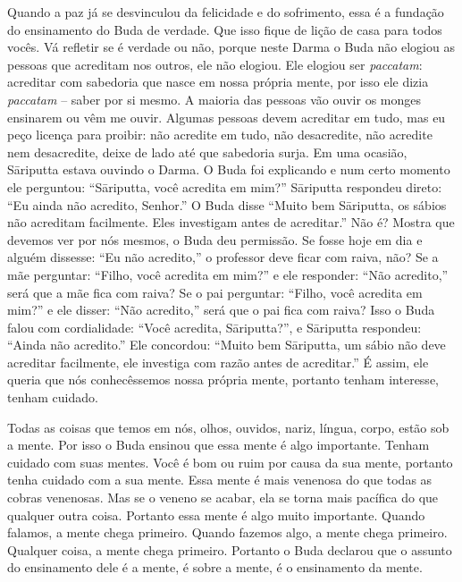 Quando a paz já se desvinculou da felicidade e do sofrimento, essa é
a fundação do ensinamento do Buda de verdade. Que isso fique de lição
de casa para todos vocês. Vá refletir se é verdade ou não, porque neste
Darma o Buda não elogiou as pessoas que acreditam nos outros, ele não
elogiou. Ele elogiou ser \textit{paccatam}: acreditar com sabedoria que
nasce em nossa própria mente, por isso ele dizia \textit{paccatam}
– saber por si mesmo. A maioria das pessoas vão
ouvir os monges ensinarem ou vêm me ouvir. Algumas pessoas devem
acreditar em tudo, mas eu peço licença para proibir: não acredite em
tudo, não desacredite, não acredite nem desacredite, deixe de lado até
que sabedoria surja. Em uma ocasião, Sāriputta estava ouvindo o
Darma. O Buda foi explicando e num certo momento ele perguntou:
“Sāriputta, você acredita em mim?” Sāriputta respondeu direto: “Eu
ainda não acredito, Senhor.” O Buda disse “Muito bem Sāriputta, os
sábios não acreditam facilmente. Eles investigam antes de acreditar.”
Não é? Mostra que devemos ver por nós mesmos, o Buda deu permissão. Se
fosse hoje em dia e alguém dissesse: “Eu não acredito,” o
professor deve ficar com raiva, não? Se a mãe perguntar:
“Filho, você acredita em mim?” e ele responder: “Não acredito,” será
que a mãe fica com raiva? Se o pai perguntar: “Filho, você acredita em
mim?” e ele disser: “Não acredito,” será que o pai fica com raiva? Isso
o Buda falou com cordialidade: “Você acredita, Sāriputta?”, e
Sāriputta respondeu: “Ainda não acredito.” Ele concordou: “Muito bem
Sāriputta, um sábio não deve acreditar facilmente, ele investiga com
razão antes de acreditar.” É assim, ele queria que nós conhecêssemos
nossa própria mente, portanto tenham interesse, tenham cuidado. 

Todas as coisas que temos em nós, olhos, ouvidos, nariz, língua,
corpo, estão sob a mente. Por isso o Buda ensinou que essa mente é algo
importante. Tenham cuidado com suas mentes. Você é bom ou ruim por
causa da sua mente, portanto tenha cuidado com a sua mente. Essa mente
é mais venenosa do que todas as cobras venenosas. Mas se o veneno se
acabar, ela se torna mais pacífica do que qualquer outra coisa.
Portanto essa mente é algo muito importante. Quando falamos, a mente
chega primeiro. Quando fazemos algo, a mente chega primeiro. Qualquer
coisa, a mente chega primeiro. Portanto o Buda declarou que o assunto
do ensinamento dele é a mente, é sobre a mente, é o ensinamento da
mente. 


